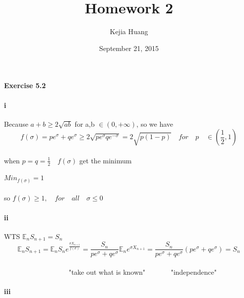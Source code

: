 \documentclass{article}
\begin{document}
\title {Homework 2}
\date {September 21, 2015}
\author{Kejia Huang}
\maketitle

\paragraph{Exercise 5.2}
\paragraph{i}{Because $a+b\ge 2\sqrt{ab}$ for a,b $\in (0,+\infty)$, so we have}
\begin{displaymath}
  f(\sigma)=pe^{\sigma}+qe^{\sigma}\ge 2\sqrt{pe^{\sigma}qe^{-\sigma}}=2\sqrt{p(1-p)}\quad for\quad p\quad \in (\frac{1}{2},1)
\end{displaymath}
\paragraph{}{when $p=q=\frac{1}{2}\quad  f(\sigma)$ get the minimum  }
\paragraph{}{$Min_{f(\sigma)}=1$}
\paragraph{}{so $f(\sigma)\ge1,\quad for\quad all\quad \sigma \le 0$ }
\paragraph{ii}{WTS  $\mathbb{E}_{n}S_{n+1}=S_{n}$}
\begin{displaymath}
  \mathbb{E}_{n}S_{n+1}=\mathbb{E}_{n}S_{n}e^{\frac{\sigma X_{n+1}}{ f(\sigma)}}=\frac{S_{n}}{pe^{\sigma}+qe^{\sigma}}\mathbb{E}_{n}e^{\sigma X_{n+1}}
  =\frac{S_{n}}{pe^{\sigma}+qe^{\sigma}}(pe^{\sigma}+qe^{\sigma})=S_{n}
\end{displaymath}
\paragraph{}{$\quad\quad\quad\quad\quad\quad\quad\quad\quad$ "take out what is known" $\quad\quad\quad$     "independence"}
\paragraph{iii}{}
\end{document}
